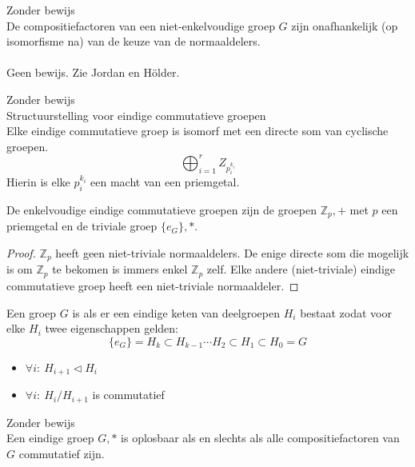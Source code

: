 \documentclass[main.tex]{subfiles}
\begin{document}
\begin{st}
  Zonder bewijs\\
  De compositiefactoren van een niet-enkelvoudige groep $G$ zijn onafhankelijk (op isomorfisme na) van de keuze van de normaaldelers.\\\\
  Geen bewijs. Zie Jordan en H\"older.
\end{st}

\begin{st}
  Zonder bewijs\\
  Structuurstelling voor eindige commutatieve groepen\\
  Elke eindige commutatieve groep is isomorf met een directe som van cyclische groepen.
  \[ \bigoplus_{i=1}^{r} Z_{p_{i}^{k_{i}}} \]
  Hierin is elke $p_{i}^{k_{i}}$ een macht van een priemgetal.
\end{st}


\begin{pr}
  De enkelvoudige eindige commutatieve groepen zijn de groepen $\mathbb{Z}_{p},+$ met $p$ een priemgetal en de triviale groep $\{e_{G}\},*$.
  \begin{proof}
    $\mathbb{Z}_{p}$ heeft geen niet-triviale normaaldelers. De enige directe som die mogelijk is om $\mathbb{Z}_{p}$ te bekomen is immers enkel $\mathbb{Z}_{p}$ zelf.
    \waarom
    Elke andere (niet-triviale) eindige commutatieve groep heeft een niet-triviale normaaldeler.
\waarom
  \end{proof}
\end{pr}

\begin{de}
  \label{de:oplosbaar}
  Een groep $G$ is  als er een eindige keten van deelgroepen $H_{i}$ bestaat zodat voor elke $H_{i}$ twee eigenschappen gelden:
  \[ \{e_{G}\} = H_{k} \subset H_{k-1} \dotsb H_{2} \subset H_{1} \subset H_{0} = G \]
  \begin{itemize}
  \item $\forall i:\ H_{i+1} \triangleleft H_{i}$
  \item $\forall i:\ H_{i}/H_{i+1}$ is commutatief
  \end{itemize}
\end{de}

\begin{st}
  Zonder bewijs\\
  Een eindige groep $G,*$ is oplosbaar als en slechts als alle compositiefactoren van $G$ commutatief zijn.
\end{st}
\end{document}
